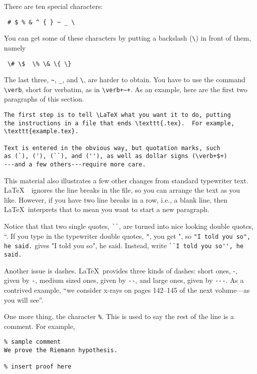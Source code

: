 \documentclass[12pt]{article}
\newcommand{\latex}{\LaTeX\ }
\begin{document}
There are ten special characters:

\begin{verbatim} # $ % & ^ { } ~ _ \ 
\end{verbatim}

You can get some of these characters by putting a backslash
(\verb+\+) in front of them, namely

\begin{verbatim} \# \$  \% \& \{ \}
\end{verbatim}

The last three, \verb+~+, \verb+_+, and \verb+\+, are harder to obtain.
You have to use the command \verb+\verb+, short for verbatim, as in
\verb=\verb+~+=.
As an example, here are the first two paragraphs of this section.

\begin{verbatim}
The first step is to tell \LaTeX what you want it to do, putting
the instructions in a file that ends \texttt{.tex}.  For example,
\texttt{example.tex}.

Text is entered in the obvious way, but quotation marks, such
as (`), ('), (``), and (''), as well as dollar signs (\verb+$+) 
---and a few others---require more care.
\end{verbatim}

This material also illustrates a few other changes from standard
typewriter text.
\latex\ ignores the line breaks in the file, so you can arrange the
text as you like.
However, if you have two line breaks in a row, i.e., a blank line,
then \latex interprets that to mean you want to start a new paragraph.

Notice that that two single quotes, \verb+``+, are turned into
nice looking double quotes, ``.
If you type in the typewriter double quotes, \verb+"+, you get ",
so \verb+"I told you so", he said.+ gives
"I told you so", he said.
Instead, write \verb+``I told you so'', he said.+

Another issue is dashes.
\latex provides three kinds of dashes: short ones, -, given by \verb+-+,
medium sized ones, given by \verb+--+, and large ones, given by \verb+---+.
As a contrived example, ``we consider x-rays on pages 142--145 of the
next volume---as you will see''.

One more thing, the character \verb+%+.
This is used to say the rest of the line is a comment.
For example,

\begin{verbatim}
% sample comment
We prove the Riemann hypothesis.

% insert proof here
\end{verbatim}
\end{document}
